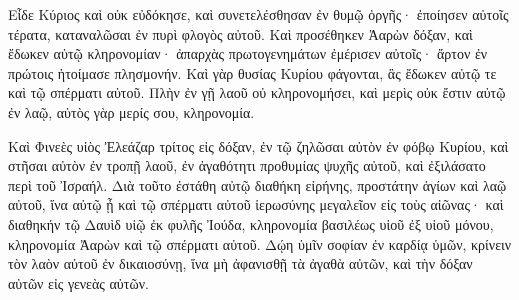 {\par }{\PP {}Εἶδε Κύριος καὶ οὐκ εὐδόκησε, καὶ συνετελέσθησαν ἐν θυμῷ ὀργῆς· ἐποίησεν αὐτοῖς τέρατα, καταναλῶσαι ἐν πυρὶ φλογὸς αὐτοῦ.
Καὶ προσέθηκεν Ἀαρὼν δόξαν, καὶ ἔδωκεν αὐτῷ κληρονομίαν· ἀπαρχὰς πρωτογενημάτων ἐμέρισεν αὐτοῖς· ἄρτον ἐν πρώτοις ἡτοίμασε πλησμονήν.
Καὶ γὰρ θυσίας Κυρίου φάγονται, ἃς ἔδωκεν αὐτῷ τε καὶ τῷ σπέρματι αὐτοῦ.
Πλὴν ἐν γῇ λαοῦ οὐ κληρονομήσει, καὶ μερὶς οὐκ ἔστιν αὐτῷ ἐν λαῷ, αὐτὸς γὰρ μερίς σου, κληρονομία.
\par }{\PP {}Καὶ Φινεὲς υἱὸς Ἐλεάζαρ τρίτος εἰς δόξαν, ἐν τῷ ζηλῶσαι αὐτὸν ἐν φόβῳ Κυρίου, καὶ στῆσαι αὐτὸν ἐν τροπῇ λαοῦ, ἐν ἀγαθότητι προθυμίας ψυχῆς αὐτοῦ, καὶ ἐξιλάσατο περὶ τοῦ Ἰσραήλ.
Διὰ τοῦτο ἐστάθη αὐτῷ διαθήκη εἰρήνης, προστάτην ἁγίων καὶ λαῷ αὐτοῦ, ἵνα αὐτῷ ᾖ καὶ τῷ σπέρματι αὐτοῦ ἱερωσύνης μεγαλεῖον εἰς τοὺς αἰῶνας·
καὶ διαθηκήν τῷ Δαυὶδ υἱῷ ἐκ φυλῆς Ἰούδα, κληρονομία βασιλέως υἱοῦ ἐξ υἱοῦ μόνου, κληρονομία Ἀαρὼν καὶ τῷ σπέρματι αὐτοῦ.
Δῴη ὑμῖν σοφίαν ἐν καρδίᾳ ὑμῶν, κρίνειν τὸν λαὸν αὐτοῦ ἐν δικαιοσύνῃ, ἵνα μὴ ἀφανισθῇ τὰ ἀγαθὰ αὐτῶν, καὶ τὴν δόξαν αὐτῶν εἰς γενεὰς αὐτῶν.

}
